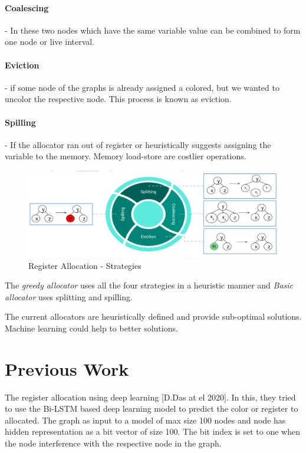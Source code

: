 \paragraph{Coalescing} - In these two nodes which have the same variable value can be combined to form one node or live interval. 
\paragraph{Eviction} - if some node of the graphs is already assigned a colored, but we wanted to uncolor the respective node. This process is known as eviction.
\paragraph{Spilling} - If the allocator ran out of register or heuristically suggests assigning the variable to the memory. Memory load-store are costlier operations.

\begin{figure}[t]
    \centering
    \includegraphics[scale=0.4]{figures/chapter-5/mlra_strategies.png}
    \caption{Register Allocation - Strategies}
     \label{fig:mlra-strat}
\end{figure}

The \textit{greedy allocator} uses all the four strategies in a heuristic manner and \textit{Basic allocator} uses splitting and spilling.

The current allocators are heuristically defined and provide sub-optimal solutions. Machine learning could help to better solutions.

\section{Previous Work}
The register allocation using deep learning [D.Das at el 2020]. In this, they tried to use the Bi-LSTM based deep learning model to predict the color or register to allocated. The graph as input to a model of max size 100 nodes and node has hidden representation as a bit vector of size 100. The bit index is set to one when the node interference with the respective node in the graph. 

